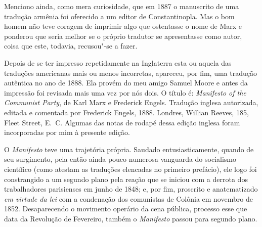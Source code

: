  Menciono ainda, como mera curiosidade, que em 1887 o manuscrito de uma
tradução armênia foi oferecido a um editor de Constantinopla. Mas o bom
homem não teve coragem de imprimir algo que ostentasse o nome de Marx e
ponderou que seria melhor se o próprio tradutor se apresentasse como
autor, coisa que este, todavia, recusou"-se a fazer.

 Depois de se ter impresso\textbf{} repetidamente na Inglaterra esta ou
aquela das traduções americanas mais ou menos incorretas, apareceu, por
fim, uma tradução autêntica no ano de 1888. Ela provém do meu amigo
Samuel Moore e antes da impressão foi revisada mais uma vez por nós
dois. O título é: \textit{Manifesto of the Communist Party}, de Karl
Marx e Frederick Engels. Tradução inglesa autorizada, editada e comentada por Frederick Engels, 1888. Londres, Willian Reeves, 185, Fleet Street, E.~C. Algumas das notas de rodapé dessa edição inglesa foram
incorporadas por mim à presente edição.

 O \textit{Manifesto} teve uma trajetória própria. Saudado
entusiasticamente, quando de seu surgimento, pela então ainda pouco
numerosa vanguarda do socialismo científico (como atestam as traduções
elencadas no primeiro prefácio), ele logo foi constrangido a um segundo
plano pela reação que se iniciou com a derrota dos trabalhadores
parisienses em junho de 1848; e, por fim, proscrito e anatematizado \textit{em
virtude da lei} com a condenação dos comunistas de Colônia em novembro
de 1852. Desaparecendo o movimento operário da cena pública, processo
esse que data da Revolução de Fevereiro, também o \textit{Manifesto}
passou para segundo plano.

